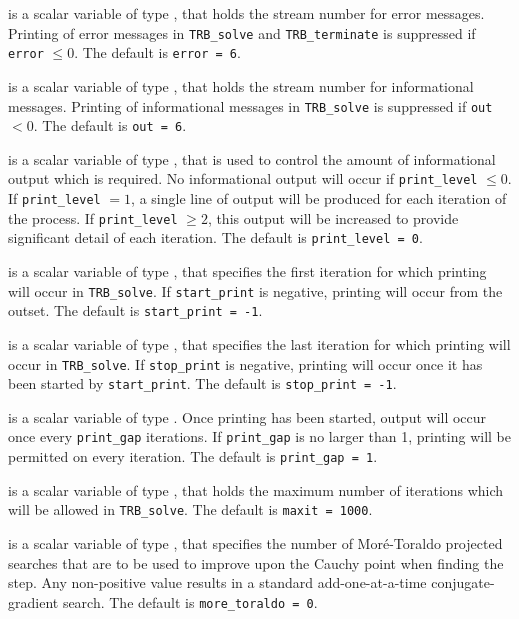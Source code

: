 \documentclass{galahad}
\newcommand{\packagename}{TRB}
\begin{document}
\begin{description}

 is a scalar variable of type \integer, that holds the
stream number for error messages. Printing of error messages in
{\tt \packagename\_solve} and {\tt \packagename\_terminate}
is suppressed if {\tt error} $\leq 0$.
The default is {\tt error = 6}.

 is a scalar variable of type \integer, that holds the
stream number for informational messages. Printing of informational messages in
{\tt \packagename\_solve} is suppressed if {\tt out} $< 0$.
The default is {\tt out = 6}.

 is a scalar variable of type \integer, that is used
to control the amount of informational output which is required. No
informational output will occur if {\tt print\_level} $\leq 0$. If
{\tt print\_level} $= 1$, a single line of output will be produced for each
iteration of the process. If {\tt print\_level} $\geq 2$, this output will be
increased to provide significant detail of each iteration.
The default is {\tt print\_level = 0}.

 is a scalar variable of type \integer, that specifies
the first iteration for which printing will occur in {\tt \packagename\_solve}.
If {\tt start\_print} is negative, printing will occur from the outset.
The default is {\tt start\_print = -1}.

 is a scalar variable of type \integer, that specifies
the last iteration for which printing will occur in  {\tt \packagename\_solve}.
If {\tt stop\_print} is negative, printing will occur once it has been
started by {\tt start\_print}.
The default is {\tt stop\_print = -1}.

 is a scalar variable of type \integer.
Once printing has been started, output will occur once every
{\tt print\_gap} iterations. If {\tt print\_gap} is no larger than 1,
printing will be permitted on every iteration.
The default is {\tt print\_gap = 1}.

 is a scalar variable of type \integer, that holds the
maximum number of iterations which will be allowed in {\tt \packagename\_solve}.
The default is {\tt maxit = 1000}.

 is a scalar variable of type \integer, that
specifies the number of Mor\'{e}-Toraldo projected searches
that are to be used to improve upon the Cauchy point when finding the
step. Any non-positive value results in a standard add-one-at-a-time
conjugate-gradient search.
The default is {\tt more\_toraldo = 0}.


\end{description}
\end{document}
